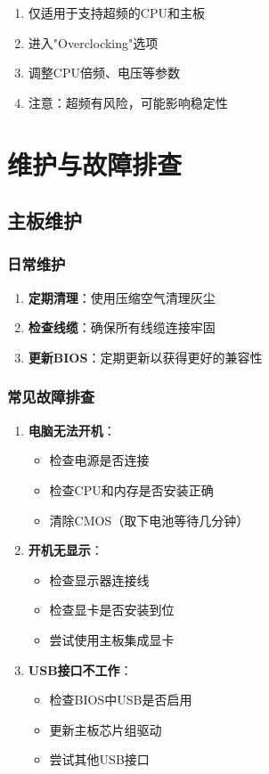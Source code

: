 \documentclass[12pt,UTF8]{ctexbook}
\begin{document}
\begin{enumerate}
    \item 仅适用于支持超频的CPU和主板
    \item 进入"Overclocking"选项
    \item 调整CPU倍频、电压等参数
    \item 注意：超频有风险，可能影响稳定性
\end{enumerate}

\part{维护与故障排查}

\chapter{主板维护}

\section{日常维护}

\begin{enumerate}
    \item \textbf{定期清理}：使用压缩空气清理灰尘
    \item \textbf{检查线缆}：确保所有线缆连接牢固
    \item \textbf{更新BIOS}：定期更新以获得更好的兼容性
\end{enumerate}

\section{常见故障排查}

\begin{enumerate}
    \item \textbf{电脑无法开机}：
    \begin{itemize}[leftmargin=2em]
        \item 检查电源是否连接
        \item 检查CPU和内存是否安装正确
        \item 清除CMOS（取下电池等待几分钟）
    \end{itemize}
    
    \item \textbf{开机无显示}：
    \begin{itemize}[leftmargin=2em]
        \item 检查显示器连接线
        \item 检查显卡是否安装到位
        \item 尝试使用主板集成显卡
    \end{itemize}
    
    \item \textbf{USB接口不工作}：
    \begin{itemize}[leftmargin=2em]
        \item 检查BIOS中USB是否启用
        \item 更新主板芯片组驱动
        \item 尝试其他USB接口
    \end{itemize}
\end{enumerate}
\end{document}
